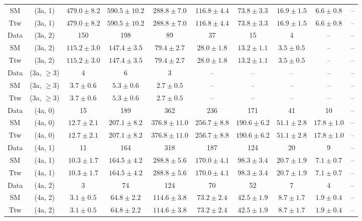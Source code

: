 \begin{table}[h!]
{\begin{tabular}{cccccccccc}
	SM & (3a, 1) & $479.0\pm 8.2$ & $590.5\pm 10.2$ & $288.8\pm 7.0$ & $116.8\pm 4.4$ & $73.8\pm 3.3$ & $16.9\pm 1.5$ & $6.6\pm 0.8$ & -- \\[0.5ex] 
	Ttw & (3a, 1) & $479.0\pm 8.2$ & $590.5\pm 10.2$ & $288.8\pm 7.0$ & $116.8\pm 4.4$ & $73.8\pm 3.3$ & $16.9\pm 1.5$ & $6.6\pm 0.8$ & -- \\[0.5ex] 
	Data & (3a, 2) & 150 & 198 & 89 & 37 & 15 & 4 & -- & -- \\[0.5ex] 
	SM & (3a, 2) & $115.2\pm 3.0$ & $147.4\pm 3.5$ & $79.4\pm 2.7$ & $28.0\pm 1.8$ & $13.2\pm 1.1$ & $3.5\pm 0.5$ & -- & -- \\[0.5ex] 
	Ttw & (3a, 2) & $115.2\pm 3.0$ & $147.4\pm 3.5$ & $79.4\pm 2.7$ & $28.0\pm 1.8$ & $13.2\pm 1.1$ & $3.5\pm 0.5$ & -- & -- \\[0.5ex] 
	Data & (3a, $\ge3$) & 4 & 6 & 3 & -- & -- & -- & -- & -- \\[0.5ex] 
	SM & (3a, $\ge3$) & $3.7\pm 0.6$ & $5.3\pm 0.6$ & $2.7\pm 0.5$ & -- & -- & -- & -- & -- \\[0.5ex] 
	Ttw & (3a, $\ge3$) & $3.7\pm 0.6$ & $5.3\pm 0.6$ & $2.7\pm 0.5$ & -- & -- & -- & -- & -- \\[0.5ex] 
	Data & (4a, 0) & 15 & 189 & 362 & 236 & 171 & 41 & 10 & -- \\[0.5ex] 
	SM & (4a, 0) & $12.7\pm 2.1$ & $207.1\pm 8.2$ & $376.8\pm 11.0$ & $256.7\pm 8.8$ & $190.6\pm 6.2$ & $51.1\pm 2.8$ & $17.8\pm 1.0$ & -- \\[0.5ex] 
	Ttw & (4a, 0) & $12.7\pm 2.1$ & $207.1\pm 8.2$ & $376.8\pm 11.0$ & $256.7\pm 8.8$ & $190.6\pm 6.2$ & $51.1\pm 2.8$ & $17.8\pm 1.0$ & -- \\[0.5ex] 
	Data & (4a, 1) & 11 & 164 & 318 & 187 & 124 & 20 & 9 & -- \\[0.5ex] 
	SM & (4a, 1) & $10.3\pm 1.7$ & $164.5\pm 4.2$ & $288.8\pm 5.6$ & $170.0\pm 4.1$ & $98.3\pm 3.4$ & $20.7\pm 1.9$ & $7.1\pm 0.7$ & -- \\[0.5ex] 
	Ttw & (4a, 1) & $10.3\pm 1.7$ & $164.5\pm 4.2$ & $288.8\pm 5.6$ & $170.0\pm 4.1$ & $98.3\pm 3.4$ & $20.7\pm 1.9$ & $7.1\pm 0.7$ & -- \\[0.5ex] 
	Data & (4a, 2) & 3 & 74 & 124 & 70 & 52 & 7 & 4 & -- \\[0.5ex] 
	SM & (4a, 2) & $3.1\pm 0.5$ & $64.8\pm 2.2$ & $114.6\pm 3.8$ & $73.2\pm 2.4$ & $42.5\pm 1.9$ & $8.7\pm 1.7$ & $1.9\pm 0.4$ & -- \\[0.5ex] 
	Ttw & (4a, 2) & $3.1\pm 0.5$ & $64.8\pm 2.2$ & $114.6\pm 3.8$ & $73.2\pm 2.4$ & $42.5\pm 1.9$ & $8.7\pm 1.7$ & $1.9\pm 0.4$ & -- \\[0.5ex] 

\end{tabular}}
\end{table}
